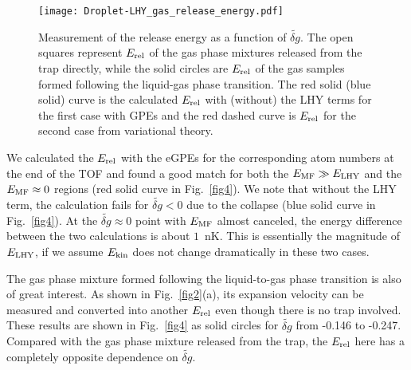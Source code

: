 \begin{figure}[t]
\begin{center}
\texttt{[image: Droplet-LHY\_gas\_release\_energy.pdf]}
\end{center}
\caption[Measurement of the release energy as a function of $\widetilde{\delta g}$]{Measurement of the release energy as a function of $\widetilde{\delta g}$. The open squares represent $E_{\rm rel}$ of the gas phase mixtures released from the trap directly, while the solid circles are $E_{\rm rel}$ of the gas samples formed following the liquid-gas phase transition. The red solid (blue solid) curve is the calculated $E_{\rm rel}$ with (without) the LHY terms for the first case with GPEs and the red dashed curve is $E_{\rm rel}$ for the second case from variational theory.}  
\label{LHY-release}
\end{figure}


We calculated the $E_{\rm rel}$ with the eGPEs for the corresponding atom numbers at the end of the TOF and found a good match for both the $E_{\rm MF}\gg E_{\rm LHY}$ and the $E_{\rm MF} \approx 0$ regions (red solid curve in Fig.~\ref{fig4}). We note that without the LHY term, the calculation fails for $\widetilde{\delta g} < 0$ due to the collapse (blue solid curve in Fig.~\ref{fig4}). 
At the $\widetilde{\delta g} \approx 0$ point with $E_{\rm MF}$ almost canceled, the energy difference between the two calculations is about $1$~nK. This is essentially the magnitude of $E_\text{\rm LHY}$, if we assume $E_{\rm kin}$ does not change dramatically in these two cases.   

The gas phase mixture formed following the liquid-to-gas phase transition is also of great interest. As shown in Fig.~\ref{fig2}(a), its expansion velocity can be measured and converted into another $E_{\rm rel}$ even though there is no trap involved. 
These results are shown in Fig.~\ref{fig4} as solid circles for $\widetilde{\delta g}$ from -0.146 to -0.247. 
Compared with the gas phase mixture released from the trap, the $E_{\rm rel}$ here has a completely opposite dependence on $\widetilde{\delta g}$. 

